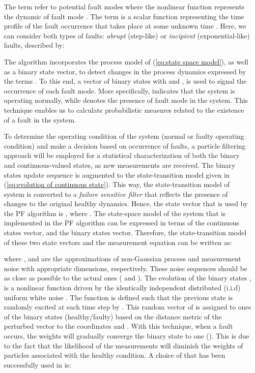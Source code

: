 \documentclass[10pt,twocolumn,twoside]{IEEEtran}
\begin{document}
The term 
refer to  potential fault modes where the nonlinear function 
represents the dynamic of fault mode . The term 
is a scalar function representing the time profi{}le of the fault
occurrence that takes place at some unknown time . Here, we
can consider both types of faults: \emph{abrupt} (step-like) or \emph{incipient}
(exponential-like) faults, described by:

The algorithm incorporates the process model of (\ref{eq:state space model}),
as well as a binary state vector, to detect changes in the process
dynamics expressed by the terms . To this end, a
vector of binary states  with  and , is used
to signal the occurrence of each fault mode. More specifically, 
indicates that the system is operating normally, while 
denotes the presence of fault mode  in the system. This technique
enables us to calculate probabilistic measures related to the existence
of a fault in the system. 

To determine the operating condition of the system (normal or faulty
operating condition) and make a decision based on occurrence of faults,
a particle filtering approach will be employed for a statistical characterization
of both the binary and continuous-valued states, as new measurements
are received. The binary states update sequence is augmented to the
state-transition model  given in (\ref{eq:evolution of continuous state}).
This way, the state-transition model of system  is converted to
a \emph{failure sensitive filter} that reflects the presence of changes
to the original healthy dynamics. Hence, the state vector that is
used by the PF algorithm is , where . The state-space model of the system that is implemented in the PF algorithm can be
expressed in terms of the continuous states vector, and the binary
states vector. Therefore, the state-transition model of these two
state vectors and the measurement equation can be written as:

\noindent where , and 
are the approximations of non-Gaussian process and measurement noise
with appropriate dimensions, respectively. These noise sequences should
be as close as possible to the actual ones ( and
). The evolution of the binary states ,
is a nonlinear function driven by the identically independent distributed
(i.i.d) uniform white noise . The function 
is defined such that the previous state  is
randomly excited at each time step by . This random
vector of  is assigned to ones of the binary states
(healthy/faulty) based on the distance metric of the perturbed vector
 to the coordinates 
and . With this technique, when a fault occurs, the weights
will gradually converge the binary state 
to one (). This is due to the
fact that the likelihood of the measurements will diminish the weights
of particles associated with the healthy condition. A choice of 
that has been successfully used in \cite{orchard2007particle,Orchard2009,raptis2011adaptive,raptisparticle}
is: 
\end{document}
